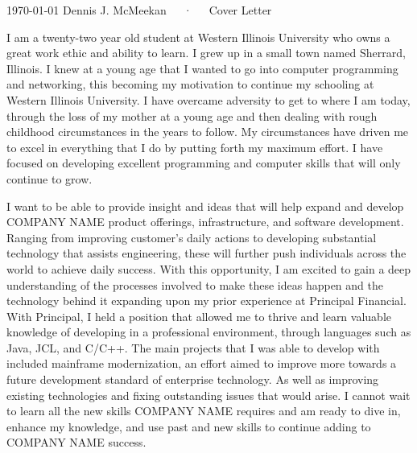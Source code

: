 \documentclass[11pt, a4paper]{awesome-cv}
\begin{document}
\makecvheader[R]

\makecvfooter
  {\today}
  {Dennis J. McMeekan~~~·~~~Cover Letter}
  {}

\makelettertitle

\begin{cvletter}

I am a twenty-two year old student at Western Illinois University who owns a great work ethic and ability to learn. I grew up in a small town named Sherrard, Illinois. I knew at a young age that I wanted to go into computer programming and networking, this becoming my motivation to continue my schooling at Western Illinois University. I have overcame adversity to get to where I am today, through the loss of my mother at a young age and then dealing with rough childhood circumstances in the years to follow. My circumstances have driven me to excel in everything that I do by putting forth my maximum effort. I have focused on developing excellent programming and computer skills that will only continue to grow.


I want to be able to provide insight and ideas that will help expand and develop COMPANY NAME product offerings, infrastructure, and software development. Ranging from improving customer's daily actions to developing substantial technology that assists engineering, these will further push individuals across the world to achieve daily success. With this opportunity, I am excited to gain a deep understanding of the processes involved to make these ideas happen and the technology behind it expanding upon my prior experience at Principal Financial. With Principal, I held a position that allowed me to thrive and learn valuable knowledge of developing in a professional environment, through languages such as Java, JCL, and C/C++. The main projects that I was able to develop with included mainframe modernization, an effort aimed to improve more towards a future development standard of enterprise technology. As well as improving existing technologies and fixing outstanding issues that would arise. I cannot wait to learn all the new skills COMPANY NAME requires and am ready to dive in, enhance my knowledge, and use past and new skills to continue adding to COMPANY NAME success.


\end{cvletter}
\end{document}
